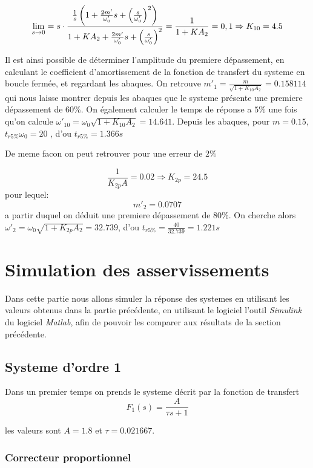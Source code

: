 \documentclass[12pt, a4paper]{report}
\begin{document}
$$
    \lim_{s \rightarrow 0} = s \cdot \frac{\frac{1}{s}\left(1 + \frac{2m'}{\omega_0'}s + \left( \frac{s}{\omega_0'}\right)^2\right)}{1 + KA_2 + \frac{2m'}{\omega_0'}s + \left( \frac{s}{\omega_0'}\right)^2} = \frac{1}{1 + KA_2} = 0,1 \Rightarrow K_{10} = 4.5 \\
$$

Il est ainsi possible de déterminer l'amplitude du premiere dépassement, en calculant le coefficient
d'amortissement de la fonction de transfert du systeme en boucle fermée, et regardant les abaques. On retrouve $m'_1 = \frac{m}{\sqrt{1+K_{10}A_2}} = 0.158114$ qui nous laisse montrer depuis les abaques que 
le systeme présente une premiere dépassement de $60\%$. On également calculer le temps de réponse a $5\%$ une fois qu'on calcule $\omega'_{10} = \omega_0 \sqrt{1 + K_{10}A_2} = 14.641$. Depuis les abaques, pour $m = 0.15$, $t_{r5\%}\omega_0 = 20$
, d'ou $t_{r5\%} = 1.366s$


De meme facon on peut retrouver pour une erreur de $2\%$

$$
\frac{1}{K_{2p}A} = 0.02 \Rightarrow K_{2p} = 24.5
$$
pour lequel:
$$
    m'_{2} = 0.0707
$$
a partir duquel on déduit une premiere dépassement de $80\%$. On cherche alors $\omega'_{2} = \omega_0 \sqrt{1 + K_{2p}A_2} = 32.739$, d'ou $t_{r5\%} = \frac{40}{32.739} = 1.221s$


\section{Simulation des asservissements}

Dans cette partie nous allons simuler la réponse des systemes en utilisant les valeurs
obtenus dans la partie précédente, en utilisant le logiciel l'outil \textit{Simulink} du logiciel \textit{Matlab},
afin de pouvoir les comparer aux résultats de la section précédente.

\subsection{Systeme d'ordre 1}
Dans un premier temps on prends le systeme décrit par la fonction de transfert
$$
    F_{1}(s) = \frac{A}{\tau s + 1}
$$

les valeurs sont $A = 1.8$ et $\tau = 0.021667$.

\subsubsection{Correcteur proportionnel}
\end{document}
